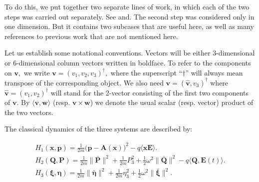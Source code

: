 \documentclass[12pt]{article}
\numberwithin{equation}{section}
\newcommand{\bxi}{{\boldsymbol \xi}}
\newcommand{\bet}{{\boldsymbol \eta}}
\def\bw{{\boldsymbol w}}
\def\bA{{\boldsymbol A}}
\def\bv{{\boldsymbol v}}
\def\bp{{\boldsymbol p}}
\def\bP{{\boldsymbol P}}
\def\bE{{\boldsymbol E}}
\def\bQ{{\boldsymbol Q}}
\def\bx{{\boldsymbol x}}
\begin{document}
To do this, we put together two separate lines of work, in which each of the two steps was carried out separately. See \cite{Gz1} and\cite{Gz2}. The second step was considered only in one dimension. But it contains two subcases that are useful here, as well as many references to previous work that are not mentioned here.

Let us establish some notational conventions. Vectors will be either 3-dimensional or 6-dimensional column vectors written in boldface. To refer to the components on $\bv,$ we write $\bv=(v_1,v_2,v_3)^\dag,$ where the superscript ``$\dag$'' will always mean transpose of the corresponding object. We also need $\bv=(\hat{\bv},v_3)^\dag$ where $\hat{\bv}=(v_1,v_2)^\dag$ will stand for the 2-vector consisting of the first two components of $\bv.$ By $\langle\bv,\bw\rangle$ (resp. $\bv\times\bw$) we denote the usual scalar (resp. vector) product of the two vectors.

The classical dynamics of the three systems are described by:

\begin{gather}
H_1(\bx,\bp) = \frac{1}{2m}\big(\bp-\bA(\bx)\big)^2 -q\langle\bx\bE\rangle.\label{ch1}\\
H_2(\bQ,\bP) = \frac{1}{2m}\|\bar{\bP}\|^2 +\frac{1}{2m}P_3^2  + \frac{1}{2}\omega^2\|\bar{\bQ}\|^2 - q\langle\bQ,\bE(t)\rangle.\label{ch2}\\
H_3(\bxi,\bet) = \frac{1}{2m}\|\bar{\bet}\|^2 + \frac{1}{2m}\eta_3^2 + \frac{1}{2}\omega^2\|\bar{\bxi}\|^2 .\label{ch3}
\end{gather}
\end{document}
